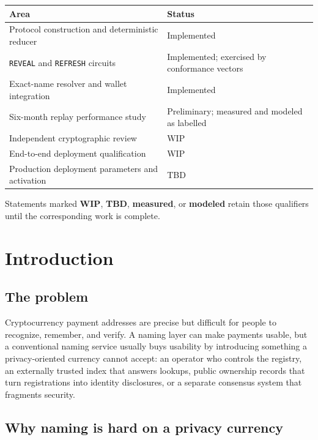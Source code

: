 \documentclass[11pt]{article}
\newcommand{\operation}[1]{\texttt{#1}}
\newcommand{\statusword}[1]{\textbf{#1}}
\begin{document}
\begin{center}
\small
\begin{tabular}{>{\raggedright\arraybackslash}p{}p{}}
\toprule
Area & Status \\
\midrule
Protocol construction and deterministic reducer & Implemented \\
\operation{REVEAL} and \operation{REFRESH} circuits & Implemented; exercised by conformance vectors \\
Exact-name resolver and wallet integration & Implemented \\
Six-month replay performance study & Preliminary; measured and modeled as labelled \\
Independent cryptographic review & WIP \\
End-to-end deployment qualification & WIP \\
Production deployment parameters and activation & TBD \\
\bottomrule
\end{tabular}
\end{center}

Statements marked \statusword{WIP}, \statusword{TBD}, \statusword{measured},
or \statusword{modeled} retain those qualifiers until the corresponding work
is complete.

\tableofcontents

\section{Introduction}
\label{sec:introduction}

\subsection{The problem}

Cryptocurrency payment addresses are precise but difficult for people to
recognize, remember, and verify. A naming layer can make payments usable, but
a conventional naming service usually buys usability by introducing something
a privacy-oriented currency cannot accept: an operator who controls the
registry, an externally trusted index that answers lookups, public ownership
records that turn registrations into identity disclosures, or a separate
consensus system that fragments security.

\subsection{Why naming is hard on a privacy currency}
\end{document}
